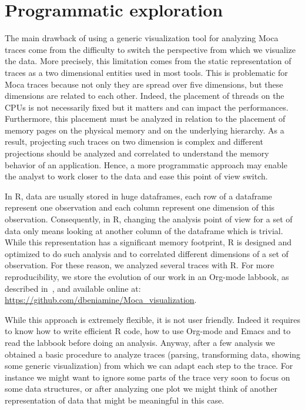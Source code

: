 \section{Programmatic exploration}
\label{sec:visu-second}

The main drawback of using a generic visualization tool for analyzing \gls{Moca} traces come from the difficulty to switch the perspective from which we visualize the data.
More precisely, this limitation comes from the static representation of traces as a two dimensional entities used in most tools.
This is problematic for \gls{Moca} traces because not only they are spread over five dimensions, but these dimensions are related to each other.
Indeed, the placement of threads on the \glspl{CPU} is not necessarily fixed but it matters and can impact the performances.
Furthermore, this placement must be analyzed in relation to the placement of memory pages on the physical memory and on the underlying hierarchy.
As a result, projecting such traces on two dimension is complex and different projections should be analyzed and correlated to understand the memory behavior of an application.
Hence, a more programmatic approach may enable the analyst to work closer to the data and ease this point of view switch.

In \gls{R}, data are usually stored in huge dataframes, each row of a dataframe represent one observation and each column represent one dimension of this observation.
Consequently, in \gls{R}, changing the analysis point of view for a set of data only means looking at another column of the dataframe which is trivial.
While this representation has a significant memory footprint, \gls{R} is designed and optimized to do such analysis and to correlated different dimensions of a set of observation.
For these reason, we analyzed several traces with \gls{R}.
For more reproducibility, we store the evolution of our work in an \gls{Org-mode} labbook, as described in~\cite[Chapter~4, p~54]{Stanisic15Reproducible}, and available online at:\\
\url{https://github.com/dbeniamine/Moca\_visualization}.

While this approach is extremely flexible, it is not user friendly.
Indeed it requires to know how to write efficient \gls{R} code, how to use \gls{Org-mode} and Emacs and to read the labbook before doing an analysis.
Anyway, after a few analysis we obtained a basic procedure to analyze traces (parsing, transforming data, showing some generic visualization) from which we can adapt each step to the trace.
For instance we might want to ignore some parts of the trace very soon to focus on some data structures, or after analyzing one plot we might think of another representation of data that might be meaningful in this case.

